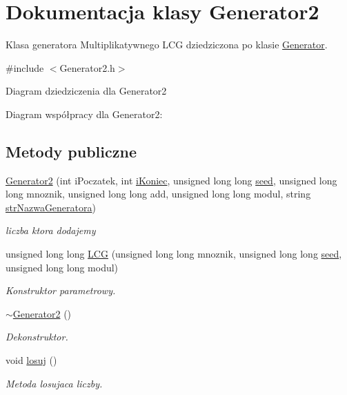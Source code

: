 \hypertarget{classGenerator2}{\section{Dokumentacja klasy Generator2}
\label{classGenerator2}
}


Klasa generatora Multiplikatywnego L\+C\+G dziedziczona po klasie \hyperlink{classGenerator}{Generator}.  




{\ttfamily \#include $<$Generator2.\+h$>$}



Diagram dziedziczenia dla Generator2


Diagram współpracy dla Generator2\+:
\subsection*{Metody publiczne}
\begin{DoxyCompactItemize}
\item 
\hyperlink{classGenerator2_a3dfa71293f5dd70d1cf3a30d7676d043}{Generator2} (int i\+Poczatek, int \hyperlink{classGenerator_a235b3d02ce62d19e803cc2295eb7911e}{i\+Koniec}, unsigned long long \hyperlink{classGenerator_ae77446ccb4946b8eb28d0f20f3e4a95f}{seed}, unsigned long long mnoznik, unsigned long long add, unsigned long long modul, string \hyperlink{classGenerator_a7e2c131c26baf31bb3f072115c619d1c}{str\+Nazwa\+Generatora})
\begin{DoxyCompactList}\small\item\em liczba ktora dodajemy \end{DoxyCompactList}\item 
unsigned long long \hyperlink{classGenerator2_a4df292bb376f2ff9ea44721fda384c0a}{L\+C\+G} (unsigned long long mnoznik, unsigned long long \hyperlink{classGenerator_ae77446ccb4946b8eb28d0f20f3e4a95f}{seed}, unsigned long long modul)
\begin{DoxyCompactList}\small\item\em Konstruktor parametrowy. \end{DoxyCompactList}\item 
\hypertarget{classGenerator2_a44a1eb78b1e847318969b476dc22746d}{\hyperlink{classGenerator2_a44a1eb78b1e847318969b476dc22746d}{$\sim$\+Generator2} ()}\label{classGenerator2_a44a1eb78b1e847318969b476dc22746d}

\begin{DoxyCompactList}\small\item\em Dekonstruktor. \end{DoxyCompactList}\item 
void \hyperlink{classGenerator2_a96705c3ab595c06470c3bbb0c24881b0}{losuj} ()
\begin{DoxyCompactList}\small\item\em Metoda losujaca liczby. \end{DoxyCompactList}\end{DoxyCompactItemize}
